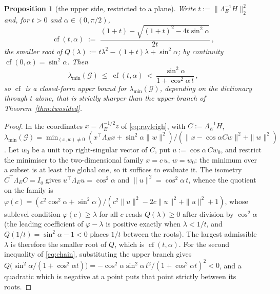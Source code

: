 \documentclass[11pt]{article}
\newtheorem{proposition}[theorem]{Proposition}
\theoremstyle{remark}
\newcommand{\Gr}{\mathcal{G}}
\newcommand{\Le}{\Lambda_E}
\begin{document}
\begin{proposition}[the upper side, restricted to a plane]\label{prop:plane}
Write $t:=\|\Le^{-1}H\|_2^2$ and, for $t>0$ and $\alpha\in(0,\pi/2)$,
\begin{equation}\label{eq:cf}
  \operatorname{cf}(t,\alpha)\;:=\;\frac{(1+t)-\sqrt{(1+t)^2-4t\sin^2\alpha}}{2t}\,,
\end{equation}
the smaller root of $Q(\lambda):=t\lambda^2-(1+t)\lambda+\sin^2\alpha$; by continuity
$\operatorname{cf}(0,\alpha)=\sin^2\alpha$. Then
\begin{equation}\label{eq:chain}
  \lambda_{\min}(\Gr)\ \le\ \operatorname{cf}(t,\alpha)\ <\
  \frac{\sin^2\alpha}{1+\cos^2\alpha\,t}\,,
\end{equation}
so $\operatorname{cf}$ is a closed-form upper bound for $\lambda_{\min}(\Gr)$, depending on the
dictionary through $t$ alone, that is strictly sharper than the upper branch of
Theorem~\ref{thm:twosided}.
\end{proposition}

\begin{proof}
In the coordinates $x=\Le^{-1/2}z$ of \eqref{eq:rayleigh}, with $C:=\Le^{-1}H$,
$\lambda_{\min}(\Gr)=\min_{(x,w)\ne0}(x^{\top}\Le x+\sin^2\alpha\|w\|^2)
/(\|x-\cos\alpha Cw\|^2+\|w\|^2)$.
Let $w_0$ be a unit top right-singular vector of $C$, put $u:=\cos\alpha\,Cw_0$, and restrict the
minimiser to the two-dimensional family $x=c\,u$, $w=w_0$: the minimum over a subset is at least the
global one, so it suffices to evaluate it. The isometry $C^{\top}\Le C=I_q$ gives
$u^{\top}\Le u=\cos^2\alpha$ and $\|u\|^2=\cos^2\alpha\,t$, whence the quotient on the family is
$\varphi(c)=(c^2\cos^2\alpha+\sin^2\alpha)/(c^2\|u\|^2-2c\|u\|^2+\|u\|^2+1)$, whose
sublevel condition $\varphi(c)\ge\lambda$ for all $c$ reads
$Q(\lambda)\ge0$ after division by $\cos^2\alpha$ (the leading coefficient of $\varphi-\lambda$ is
positive exactly when $\lambda<1/t$, and $Q(1/t)=\sin^2\alpha-1<0$ places $1/t$ between the roots).
The largest admissible $\lambda$ is therefore the smaller root of $Q$, which is
$\operatorname{cf}(t,\alpha)$. For the second inequality of \eqref{eq:chain}, substituting the upper
branch gives $Q\bigl(\sin^2\alpha/(1+\cos^2\alpha t)\bigr)
=-\cos^2\alpha\sin^2\alpha\,t^2/(1+\cos^2\alpha t)^2<0$, and a quadratic which is negative at a point
puts that point strictly between its roots.
\end{proof}
\end{document}
